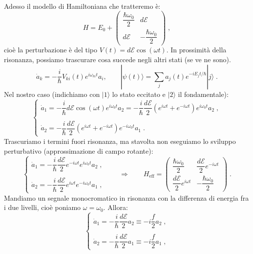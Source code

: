 \documentclass[10pt,a4paper]{report}
\theoremstyle{definition}
\numberwithin{equation}{section}
\newcommand{\ket}{\rangle}
\begin{document}
\\
Adesso il modello di Hamiltoniana che tratteremo è:
\begin{equation}
H=E_0+\left(\begin{matrix}
\dfrac{\hbar\omega_0}{2} & d\mathcal{E} \\
d\mathcal{E} & -\dfrac{\hbar\omega_0}{2}
\end{matrix}\right)\;,
\end{equation}
cioè la perturbazione è del tipo $V(t)=d\mathcal{E}\cos(\omega t)$. In prossimità della risonanza, possiamo trascurare cosa succede negli altri stati (se ve ne sono).
\begin{equation}
\dot{a}_k=-\frac{i}{\hbar}V_{ki}(t)e^{i\omega_{ki}t}a_i,\qquad |\psi(t)\ket=\sum_ja_j(t)e^{-iE_jt/\hbar}|j\ket\;.
\end{equation}
Nel nostro caso (indichiamo con $|1\ket$ lo stato eccitato e $|2\ket$ il fondamentale):
\begin{equation*}
\begin{cases}
\dot{a}_1=-\dfrac{i}{\hbar}d\mathcal{E}\cos(\omega t) e^{i\omega_0t}a_2=-\dfrac{i}{\hbar}\dfrac{d\mathcal{E}}{2}(e^{i\omega t}+e^{-i\omega t})e^{i\omega_0t}a_2\;, \\
\\
\dot{a}_2=-\dfrac{i}{\hbar}\dfrac{d\mathcal{E}}{2}(e^{i\omega t}+e^{-i\omega t})e^{-i\omega_0t}a_1\;.
\end{cases}
\end{equation*}
Trascuriamo i termini fuori risonanza, ma stavolta non eseguiamo lo sviluppo perturbativo (approssimazione di campo rotante):
\begin{equation}
\begin{cases}
\dot{a}_1=-\dfrac{i}{\hbar}\dfrac{d\mathcal{E}}{2}e^{-i\omega t}e^{i\omega_0t}a_2\;, \\
\\
\dot{a}_2=-\dfrac{i}{\hbar}\dfrac{d\mathcal{E}}{2}e^{i\omega t}e^{-i\omega_0t}a_1\;,
\end{cases}\qquad \Longrightarrow \qquad
H_{\mathrm{eff}}=\left(\begin{matrix}
\dfrac{\hbar\omega_0}{2} & \dfrac{d\mathcal{E}}{2}e^{-i\omega t} \\
\dfrac{d\mathcal{E}}{2}e^{i\omega t} & -\dfrac{\hbar\omega_0}{2}
\end{matrix}\right)\;.
\end{equation}
Mandiamo un segnale monocromatico in risonanza con la differenza di energia fra i due livelli, cioè poniamo $\omega=\omega_0$. Allora:
\begin{equation*}
\begin{cases}
\dot{a}_1 =-\dfrac{i}{\hbar}\dfrac{d\mathcal{E}}{2}a_2\equiv -i\dfrac{f}{2}a_2\;, \\
\\
\dot{a}_2 =-\dfrac{i}{\hbar}\dfrac{d\mathcal{E}}{2}a_1\equiv -i\dfrac{f}{2}a_1\;,
\end{cases}
\end{equation*}
\end{document}
